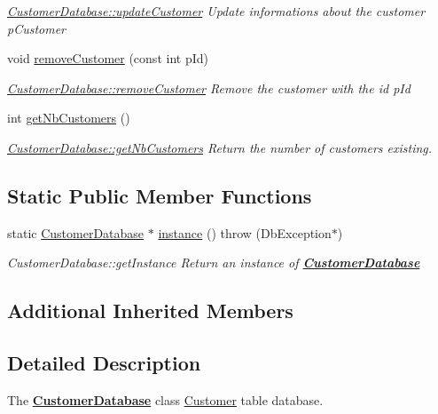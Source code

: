 \begin{DoxyCompactItemize}
\begin{DoxyCompactList}\small\item\em \hyperlink{classCustomerDatabase_a2ae17af9bcbf889dec21b4acae3161e1}{Customer\+Database\+::update\+Customer} Update informations about the customer {\itshape p\+Customer} \end{DoxyCompactList}\item 
void \hyperlink{classCustomerDatabase_aa1d21765bdf6319e580b3fcf20d841d1}{remove\+Customer} (const int p\+Id)
\begin{DoxyCompactList}\small\item\em \hyperlink{classCustomerDatabase_aa1d21765bdf6319e580b3fcf20d841d1}{Customer\+Database\+::remove\+Customer} Remove the customer with the id {\itshape p\+Id} \end{DoxyCompactList}\item 
int \hyperlink{classCustomerDatabase_a1c60ecbaa2594426b522746c70beee19}{get\+Nb\+Customers} ()
\begin{DoxyCompactList}\small\item\em \hyperlink{classCustomerDatabase_a1c60ecbaa2594426b522746c70beee19}{Customer\+Database\+::get\+Nb\+Customers} Return the number of customers existing. \end{DoxyCompactList}\end{DoxyCompactItemize}
\subsection*{Static Public Member Functions}
\begin{DoxyCompactItemize}
\item 
static \hyperlink{classCustomerDatabase}{Customer\+Database} $\ast$ \hyperlink{classCustomerDatabase_a2b9546b1e5803c4055529d2a7f7df95e}{instance} ()  throw (\+Db\+Exception$\ast$)
\begin{DoxyCompactList}\small\item\em Customer\+Database\+::get\+Instance Return an instance of {\bfseries \hyperlink{classCustomerDatabase}{Customer\+Database}} \end{DoxyCompactList}\end{DoxyCompactItemize}
\subsection*{Additional Inherited Members}


\subsection{Detailed Description}
The {\bfseries \hyperlink{classCustomerDatabase}{Customer\+Database}} class \hyperlink{classCustomer}{Customer} table database. 

